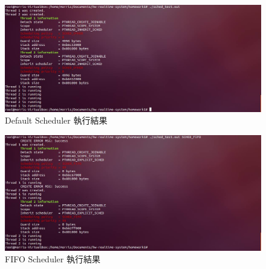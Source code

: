 \documentclass{res}
\begin{document}
\begin{resume}
\begin{figure}[htp]
    \begin{center}
        \includegraphics[width=400pt]{images/result1.jpg}
        \caption{Default Scheduler 執行結果}
        \label{fig: result}
    \end{center}
\end{figure}

\begin{figure}[htp]
    \begin{center}
        \includegraphics[width=400pt]{images/result2.jpg}
        \caption{FIFO Scheduler 執行結果}
        \label{fig: result}
    \end{center}
\end{figure}

\end{resume}
\end{document}
